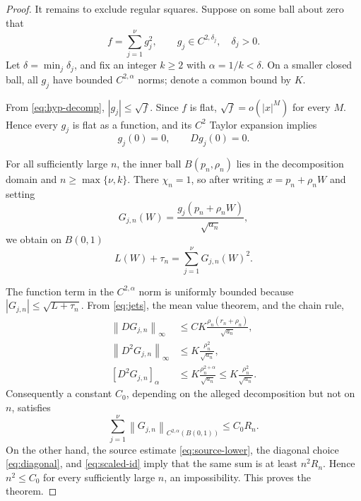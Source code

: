 \documentclass[11pt]{article}
\newcommand{\norm}[1]{\left\lVert #1\right\rVert}
\begin{document}
\begin{proof}
It remains to exclude regular squares.  Suppose on some ball about zero that
\begin{equation}\label{eq:hyp-decomp}
 f=\sum_{j=1}^{\nu}g_j^2,
 \qquad g_j\in C^{2,\delta_j},\quad\delta_j>0.
\end{equation}
Let \(\delta=\min_j\delta_j\), and fix an integer \(k\geq2\) with
\(\alpha=1/k<\delta\).  On a smaller closed ball, all \(g_j\) have bounded
\(C^{2,\alpha}\) norms; denote a common bound by \(K\).

From \eqref{eq:hyp-decomp}, \(|g_j|\leq\sqrt f\).  Since \(f\) is flat,
\(\sqrt f=o(|x|^M)\) for every \(M\).  Hence every \(g_j\) is flat as a
function, and its \(C^2\) Taylor expansion implies
\begin{equation}\label{eq:jets}
 g_j(0)=0,\qquad Dg_j(0)=0.
\end{equation}

For all sufficiently large \(n\), the inner ball
\(B(p_n,\rho_n)\) lies in the decomposition domain and \(n\geq\max\{\nu,k\}\).
There \(\chi_n=1\), so after writing \(x=p_n+\rho_nW\) and setting
\begin{equation}\label{eq:G}
 G_{j,n}(W)=\frac{g_j(p_n+\rho_nW)}{\sqrt{a_n}},
\end{equation}
we obtain on \(B(0,1)\)
\begin{equation}\label{eq:scaled-id}
 L(W)+\tau_n=\sum_{j=1}^{\nu}G_{j,n}(W)^2.
\end{equation}

The function term in the \(C^{2,\alpha}\) norm is uniformly bounded because
\(|G_{j,n}|\leq\sqrt{L+\tau_n}\).  From \eqref{eq:jets}, the mean value
theorem, and the chain rule,
\begin{align*}
 \norm{DG_{j,n}}_\infty
 &\leq C K\frac{\rho_n(r_n+\rho_n)}{\sqrt{a_n}},\\
 \norm{D^2G_{j,n}}_\infty
 &\leq K\frac{\rho_n^2}{\sqrt{a_n}},\\
 [D^2G_{j,n}]_{\alpha}
 &\leq K\frac{\rho_n^{2+\alpha}}{\sqrt{a_n}}
 \leq K\frac{\rho_n^2}{\sqrt{a_n}}.
\end{align*}
Consequently a constant \(C_0\), depending on the alleged decomposition but
not on \(n\), satisfies
\begin{equation}\label{eq:upper}
 \sum_{j=1}^{\nu}\norm{G_{j,n}}_{C^{2,\alpha}(B(0,1))}
 \leq C_0R_n.
\end{equation}
On the other hand, the source estimate \eqref{eq:source-lower}, the diagonal
choice \eqref{eq:diagonal}, and \eqref{eq:scaled-id} imply that the same sum
is at least \(n^2R_n\).  Hence \(n^2\leq C_0\) for every sufficiently large
\(n\), an impossibility.  This proves the theorem.
\end{proof}
\end{document}

